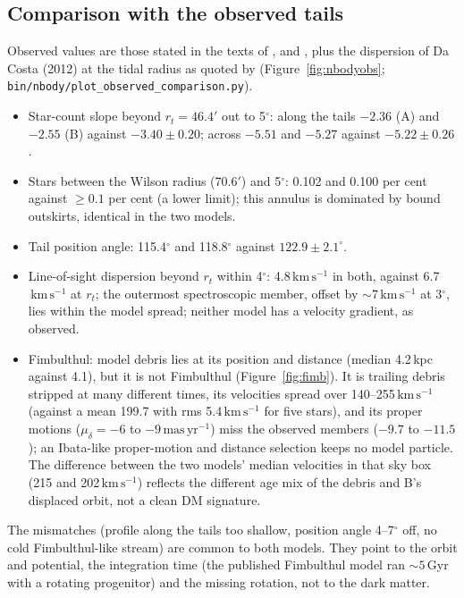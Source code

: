 \documentclass[11pt,a4paper]{article}
\newcommand{\kms}{\ensuremath{\,\mathrm{km\,s^{-1}}}\xspace}
\newcommand{\masyr}{\ensuremath{\,\mathrm{mas\,yr^{-1}}}\xspace}
\begin{document}
\subsection{Comparison with the observed tails}
\label{sec:nbodyobs}

Observed values are those stated in the texts of
\citet{2021MNRAS.507.1127K}, \citet{2026MNRAS.stag1147K} and
\citet{2019NatAs...3..667I}, plus the dispersion of Da Costa (2012) at the
tidal radius as quoted by \citet{2026MNRAS.stag1147K}
(Figure~\ref{fig:nbodyobs}; \texttt{bin/nbody/plot\_observed\_comparison.py}).
\begin{itemize}
\item Star-count slope beyond $r_t=46.4'$ out to 5$^\circ$: along the tails
  $-2.36$ (A) and $-2.55$ (B) against $-3.40\pm0.20$; across $-5.51$ and
  $-5.27$ against $-5.22\pm0.26$.
\item Stars between the Wilson radius (70.6$'$) and 5$^\circ$: 0.102 and
  0.100 per cent against $\ge0.1$ per cent (a lower limit); this annulus is
  dominated by bound outskirts, identical in the two models.
\item Tail position angle: 115.4$^\circ$ and 118.8$^\circ$ against
  $122.9\pm2.1^\circ$.
\item Line-of-sight dispersion beyond $r_t$ within 4$^\circ$: 4.8\kms in
  both, against 6.7\kms at $r_t$; the outermost spectroscopic member,
  offset by $\sim7\kms$ at 3$^\circ$, lies within the model spread; neither
  model has a velocity gradient, as observed.
\item Fimbulthul: model debris lies at its position and distance (median
  4.2\,kpc against 4.1), but it is not Fimbulthul
  (Figure~\ref{fig:fimb}). It is trailing debris stripped at many
  different times, its velocities spread over 140--255\kms (against a mean
  199.7 with rms 5.4\kms for five stars), and its proper motions
  ($\mu_\delta=-6$ to $-9\masyr$) miss the observed members ($-9.7$ to
  $-11.5$); an Ibata-like proper-motion and distance selection keeps no
  model particle. The difference between the two models' median velocities
  in that sky box (215 and 202\kms) reflects the different age mix of the
  debris and B's displaced orbit, not a clean DM signature.
\end{itemize}
The mismatches (profile along the tails too shallow, position angle 4--7$^\circ$
off, no cold Fimbulthul-like stream) are common to both models. They point
to the orbit and potential, the integration time (the published
Fimbulthul model ran $\sim5$\,Gyr with a rotating progenitor) and the
missing rotation, not to the dark matter.
\end{document}
